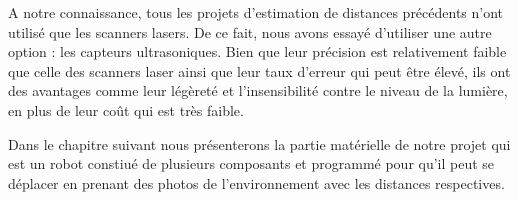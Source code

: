 A notre connaissance, tous les projets d'estimation de distances précédents
n'ont utilisé que les scanners lasers. De ce fait, nous avons essayé d'utiliser
une autre option : les capteurs ultrasoniques. Bien que leur précision est
relativement faible que celle des scanners laser ainsi que leur taux d'erreur
qui peut être élevé, ils ont des avantages comme leur légèreté et l'insensibilité
contre le niveau de la lumière, en plus de leur coût qui est très faible.

Dans le chapitre suivant nous présenterons la partie matérielle de notre projet qui
est un robot constiué de plusieurs composants et programmé pour qu'il peut se déplacer
en prenant des photos de l'environnement avec les distances respectives.
